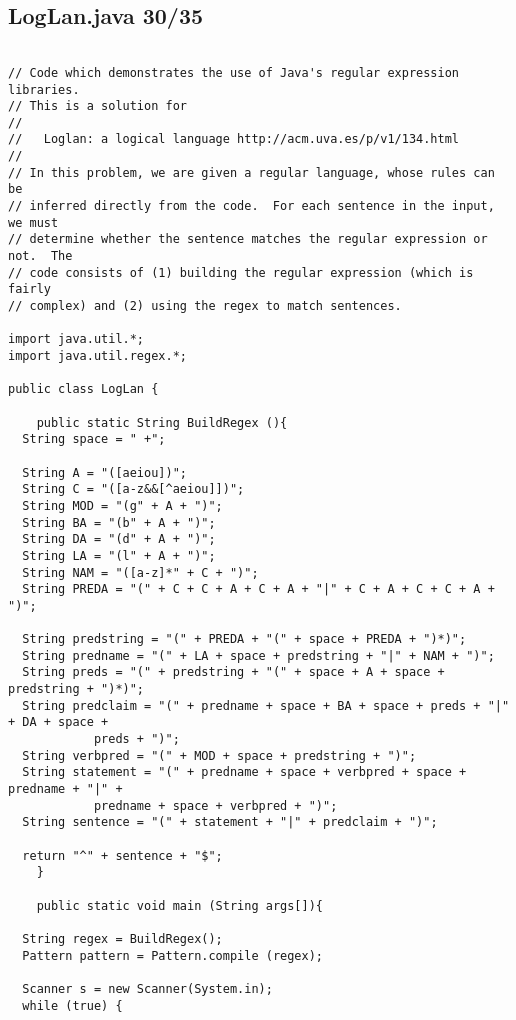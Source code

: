 \subsection{LogLan.java 30/35}
\begin{lstlisting}

// Code which demonstrates the use of Java's regular expression libraries.
// This is a solution for 
//
//   Loglan: a logical language http://acm.uva.es/p/v1/134.html
//
// In this problem, we are given a regular language, whose rules can be
// inferred directly from the code.  For each sentence in the input, we must
// determine whether the sentence matches the regular expression or not.  The
// code consists of (1) building the regular expression (which is fairly
// complex) and (2) using the regex to match sentences.

import java.util.*;
import java.util.regex.*;

public class LogLan {

    public static String BuildRegex (){
  String space = " +";

  String A = "([aeiou])";
  String C = "([a-z&&[^aeiou]])";
  String MOD = "(g" + A + ")";
  String BA = "(b" + A + ")";
  String DA = "(d" + A + ")";
  String LA = "(l" + A + ")";
  String NAM = "([a-z]*" + C + ")";
  String PREDA = "(" + C + C + A + C + A + "|" + C + A + C + C + A + ")";

  String predstring = "(" + PREDA + "(" + space + PREDA + ")*)";
  String predname = "(" + LA + space + predstring + "|" + NAM + ")";
  String preds = "(" + predstring + "(" + space + A + space + predstring + ")*)";
  String predclaim = "(" + predname + space + BA + space + preds + "|" + DA + space +
            preds + ")";
  String verbpred = "(" + MOD + space + predstring + ")";
  String statement = "(" + predname + space + verbpred + space + predname + "|" + 
            predname + space + verbpred + ")";
  String sentence = "(" + statement + "|" + predclaim + ")";

  return "^" + sentence + "$";
    }

    public static void main (String args[]){

  String regex = BuildRegex();
  Pattern pattern = Pattern.compile (regex);
  
  Scanner s = new Scanner(System.in);
  while (true) {


\end{lstlisting}
